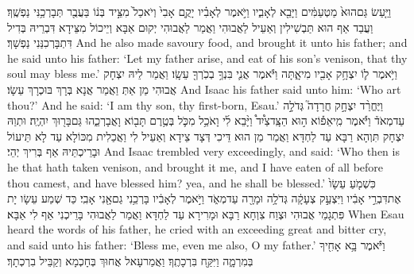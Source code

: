 {וַיַּ֤עַשׂ גַּם\maqqaf הוּא֙ מַטְעַמִּ֔ים וַיָּבֵ֖א לְאָבִ֑יו וַיֹּ֣אמֶר לְאָבִ֗יו יָקֻ֤ם אָבִי֙ וְיֹאכַל֙ מִצֵּ֣יד בְּנ֔וֹ בַּעֲבֻ֖ר תְּבָרְכַ֥נִּי נַפְשֶֽׁךָ׃}
{וַעֲבַד אַף הוּא תַּבְשִׁילִין וְאַעֵיל לַאֲבוּהִי וַאֲמַר לַאֲבוּהִי יְקוּם אַבָּא וְיֵיכוֹל מִצֵּידָא דִּבְרֵיהּ בְּדִיל דִּתְבָּרְכִנַּנִי נַפְשָׁךְ׃}
{And he also made savoury food, and brought it unto his father; and he said unto his father: ‘Let my father arise, and eat of his son’s venison, that thy soul may bless me.’}{}
{וַיֹּ֥אמֶר ל֛וֹ יִצְחָ֥ק אָבִ֖יו מִי\maqqaf אָ֑תָּה וַיֹּ֕אמֶר אֲנִ֛י בִּנְךָ֥ בְכֹֽרְךָ֖ עֵשָֽׂו׃}
{וַאֲמַר לֵיהּ יִצְחָק אֲבוּהִי מַן אַתְּ וַאֲמַר אֲנָא בְּרָךְ בּוּכְרָךְ עֵשָׂו׃}
{And Isaac his father said unto him: ‘Who art thou?’ And he said: ‘I am thy son, thy first-born, Esau.’}{}
{וַיֶּחֱרַ֨ד יִצְחָ֣ק חֲרָדָה֮ גְּדֹלָ֣ה עַד\maqqaf מְאֹד֒ וַיֹּ֡אמֶר מִֽי\maqqaf אֵפ֡וֹא ה֣וּא הַצָּֽד\maqqaf צַ֩יִד֩ וַיָּ֨בֵא לִ֜י וָאֹכַ֥ל מִכֹּ֛ל בְּטֶ֥רֶם תָּב֖וֹא וָאֲבָרְכֵ֑הוּ גַּם\maqqaf בָּר֖וּךְ יִהְיֶֽה׃}
{וּתְוַהּ יִצְחָק תִּוְהָא רַבָּא עַד לַחְדָּא וַאֲמַר מַן הוּא דֵּיכִי דְּצָד צֵידָא וְאַעֵיל לִי וַאֲכַלִית מִכּוֹלָא עַד לָא תֵּיעוֹל וּבָרֵיכְתֵּיהּ אַף בְּרִיךְ יְהֵי׃}
{And Isaac trembled very exceedingly, and said: ‘Who then is he that hath taken venison, and brought it me, and I have eaten of all before thou camest, and have blessed him? yea, and he shall be blessed.’}{}
{כִּשְׁמֹ֤עַ עֵשָׂו֙ אֶת\maqqaf דִּבְרֵ֣י אָבִ֔יו וַיִּצְעַ֣ק צְעָקָ֔ה גְּדֹלָ֥ה וּמָרָ֖ה עַד\maqqaf מְאֹ֑ד וַיֹּ֣אמֶר לְאָבִ֔יו בָּרְכֵ֥נִי גַם\maqqaf אָ֖נִי אָבִֽי׃}
{כַּד שְׁמַע עֵשָׂו יָת פִּתְגָמֵי אֲבוּהִי וּצְוַח צִוְחָא רַבָּא וּמָרִירָא עַד לַחְדָּא וַאֲמַר לַאֲבוּהִי בָּרֵיכְנִי אַף לִי אַבָּא׃}
{When Esau heard the words of his father, he cried with an exceeding great and bitter cry, and said unto his father: ‘Bless me, even me also, O my father.’}{}
{וַיֹּ֕אמֶר בָּ֥א אָחִ֖יךָ בְּמִרְמָ֑ה וַיִּקַּ֖ח בִּרְכָתֶֽךָ׃}
{וַאֲמַרעָאל אֲחוּךְ בְּחָכְמָא וְקַבֵּיל בִרְכְתָךְ׃}
